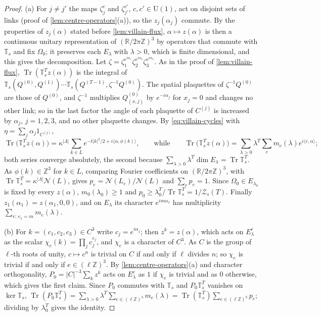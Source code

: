 \documentclass[11pt,a4paper]{amsart}
\theoremstyle{definition}
\theoremstyle{remark}
\numberwithin{equation}{section}
\DeclareMathOperator{\Tr}{Tr}        %
\newcommand{\R}{\mathbb{R}}          %
\newcommand{\Z}{\mathbb{Z}}          %
\newcommand{\ip}[2]{\langle #1,#2\rangle}  %
\newcommand{\abs}[1]{\lvert #1\rvert}      %
\newcommand{\U}{\mathrm{U}}                %
\newcommand{\TT}{\mathbb{T}}               %
\newcommand{\Zc}{\mathcal{Z}}              %
\newcommand{\Zs}[2]{\Zc_{#1}(#2)}          %
\newcommand{\lzero}{\lambda_0}             %
\newcommand{\Omegazero}{\Omega_0}          %
\begin{document}
\begin{proof}
(a) For $j\ne j'$ the maps $\zeta_j^c$ and $\zeta_{j'}^{c'}$, $c,c'\in\U(1)$, act on disjoint sets of links (proof of \cref{lem:centre-operators}\textup{(a)}), so the $z_j(\alpha_j)$ commute. By the properties of $z_j(\alpha)$ stated before \cref{lem:villain-flux}, $\alpha\mapsto z(\alpha)$ is then a continuous unitary representation of $(\R/2\pi\Z)^3$ by operators that commute with $\TT_s$ and fix $\Omegazero$; it preserves each $E_\lambda$ with $\lambda>0$, which is finite dimensional, and this gives the decomposition. Let $\zeta=\zeta_1^{e^{i\alpha_1}}\zeta_2^{e^{i\alpha_2}}\zeta_3^{e^{i\alpha_3}}$. As in the proof of \cref{lem:villain-flux}, $\Tr(\TT_s^Tz(\alpha))$ is the integral of $\TT_s(Q^{(0)},Q^{(1)})\cdots\TT_s(Q^{(T-1)},\zeta^{-1}Q^{(0)})$. The spatial plaquettes of $\zeta^{-1}Q^{(0)}$ are those of $Q^{(0)}$, and $\zeta^{-1}$ multiplies $Q^{(0)}_{(x,j)}$ by $e^{-i\alpha_j}$ for $x_j=0$ and changes no other link; so in the last factor the angle of each plaquette of $C^{(j)}$ is increased by $\alpha_j$, $j=1,2,3$, and no other plaquette changes. By \eqref{eq:villain-cycles} with $\eta=\sum_j\alpha_j1_{C^{(j)}}$,
\[
\Tr\bigl(\TT_s^Tz(\alpha)\bigr)=\kappa^{\abs\Lambda}\sum_{k\in L}e^{-t\abs k^2/2+i\ip\alpha{\phi(k)}},\qquad\text{while}\qquad\Tr\bigl(\TT_s^Tz(\alpha)\bigr)=\sum_{\lambda>0}\lambda^T\sum_em_e(\lambda)e^{i\ip e\alpha};
\]
both series converge absolutely, the second because $\sum_{\lambda>0}\lambda^T\dim E_\lambda=\Tr\TT_s^T$. As $\phi(k)\in\Z^3$ for $k\in L$, comparing Fourier coefficients on $(\R/2\pi\Z)^3$, with $\Tr\TT_s^T=\kappa^{\abs\Lambda}\mathcal N(L)$, gives $p_e=\mathcal N(L_e)/\mathcal N(L)$ and $\sum_ep_e=1$. Since $\Omegazero\in E_{\lzero}$ is fixed by every $z(\alpha)$, $m_0(\lzero)\ge1$ and $p_0\ge\lzero^T/\Tr\TT_s^T=1/\Zs sT$. Finally $z_1(\alpha_1)=z(\alpha_1,0,0)$, and on $E_\lambda$ its character $e^{im\alpha_1}$ has multiplicity $\sum_{e:\,e_1=m}m_e(\lambda)$.

(b) For $k=(c_1,c_2,c_3)\in C^3$ write $c_j=e^{i\alpha_j}$; then $z^k=z(\alpha)$, which acts on $E^e_\lambda$ as the scalar $\chi_e(k)=\prod_jc_j^{e_j}$, and $\chi_e$ is a character of $C^3$. As $C$ is the group of $\ell$-th roots of unity, $c\mapsto c^n$ is trivial on $C$ if and only if $\ell$ divides $n$; so $\chi_e$ is trivial if and only if $e\in(\ell\Z)^3$. By \cref{lem:centre-operators}\textup{(a)} and character orthogonality, $P_0=\abs C^{-3}\sum_kz^k$ acts on $E^e_\lambda$ as $1$ if $\chi_e$ is trivial and as $0$ otherwise, which gives the first claim. Since $P_0$ commutes with $\TT_s$ and $P_0\TT_s^T$ vanishes on $\ker\TT_s$, $\Tr(P_0\TT_s^T)=\sum_{\lambda>0}\lambda^T\sum_{e\in(\ell\Z)^3}m_e(\lambda)=\Tr(\TT_s^T)\sum_{e\in(\ell\Z)^3}p_e$; dividing by $\lzero^T$ gives the identity.


\end{proof}
\end{document}
